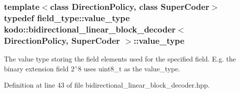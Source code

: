 \hypertarget{classkodo_1_1bidirectional__linear__block__decoder_a2039f4bd553ca7826a233080a7ecb230}{
\subsubsection[{value\-\_\-type}]{\setlength{\rightskip}{0pt plus 5cm}template$<$class Direction\-Policy, class Super\-Coder$>$ typedef field\-\_\-type\-::value\-\_\-type {\bf kodo\-::bidirectional\-\_\-linear\-\_\-block\-\_\-decoder}$<$ Direction\-Policy, Super\-Coder $>$\-::{\bf value\-\_\-type}}}\label{classkodo_1_1bidirectional__linear__block__decoder_a2039f4bd553ca7826a233080a7ecb230}




The value type storing the field elements used for the specified field. E.\-g. the binary extension field 2$^\wedge$8 uses uint8\-\_\-t as the value\-\_\-type. 

Definition at line 43 of file bidirectional\-\_\-linear\-\_\-block\-\_\-decoder.\-hpp.



